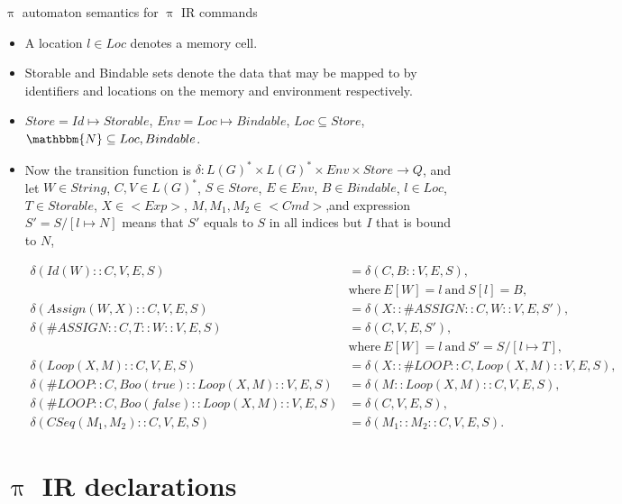 \documentclass{beamer}
\begin{document}
\begin{frame}{{\color{red}$\uppi$ automaton} semantics for {\color{red}$\uppi$ IR} commands}
\begin{itemize}
\item A location $l \in Loc$ denotes a memory cell.
\item Storable and Bindable sets denote the data that may be mapped to by identifiers and locations on the memory and environment respectively. 
\item $Store = Id \mapsto Storable$, $Env = Loc \mapsto Bindable$, $Loc \subseteq Store$, $\mathbbm{N} \subseteq Loc, Bindable$.
\item Now the transition function is $\delta : L(G)^* \times L(G)^* \times Env \times Store \to Q$, and let $W \in String$,  $C, V \in L(G)^*$, $S \in \mathit{Store}$, $E \in Env$, $B \in \mathit{Bindable}$, $l \in Loc$, $T \in \mathit{Storable}$, $X \in <Exp>$, $M, M_1, M_2 \in <Cmd>$,and expression $S' = S/[l \mapsto N]$ means that $S'$ equals to $S$ in all indices but $I$ that is bound to $N$,
\begin{tiny}
\begin{align}
\delta(Id(W) :: C, V, E, S) & = \delta(C, B :: V, E, S), \\ & \text{where}~ E[W] = l ~\text{and}~ S[l] = B,\nonumber \\
%
\delta(Assign(W, X) :: C, V, E, S) & =  \delta(X :: \#ASSIGN :: C, W :: V, E, S'), \\
\delta(\#ASSIGN :: C, T :: W :: V, E, S) & = \delta(C, V, E, S'), & \\ & \text{where}~ E[W] = l ~\text{and}~ S' = S/[l \mapsto T], \nonumber \\
%
\delta(Loop(X, M) :: C, V, E, S) & =  \delta(X :: \#LOOP :: C, Loop(X, M) :: V, E, S),  \\
\delta(\#LOOP :: C, Boo(true) :: Loop(X, M) :: V, E, S) & = \delta(M :: Loop(X, M) :: C, V, E, S),  \\
\delta(\#LOOP :: C, Boo(false) :: Loop(X, M) :: V, E, S) & = \delta(C, V, E, S), \\
%
\delta(CSeq(M_1, M_2) :: C, V, E, S) & = \delta(M_1 :: M_2 :: C, V, E, S).
\end{align}
\end{tiny}
\end{itemize}
\end{frame}

\section{$\uppi$ IR declarations}
\end{document}
